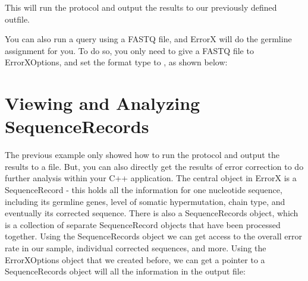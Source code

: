 \documentclass[letterpaper,10pt,english]{sphinxmanual}
\begin{document}
\begin{sphinxVerbatim}[commandchars=\\\{\}]
  
\end{sphinxVerbatim}

This will run the protocol and output the results to our previously defined outfile.

You can also run a query using a FASTQ file, and ErrorX will do the germline assignment for you. To do so, you only need to give a FASTQ file to ErrorXOptions, and set the format type to , as shown below:

\begin{sphinxVerbatim}[commandchars=\\\{\}]
    
  
  
  
  
\end{sphinxVerbatim}


\section{Viewing and Analyzing SequenceRecords}
\label{\detokenize{index:viewing-and-analyzing-sequencerecords}}
The previous example only showed how to run the protocol and output the results to a file. But, you can also directly get the results of error correction to do further analysis within your C++ application. The central object in ErrorX is a SequenceRecord - this holds all the information for one nucleotide sequence, including its germline genes, level of somatic hypermutation, chain type, and eventually its corrected sequence. There is also a SequenceRecords object, which is a collection of separate SequenceRecord objects that have been processed together. Using the SequenceRecords object we can get access to the overall error rate in our sample, individual corrected sequences, and more. Using the ErrorXOptions object that we created before, we can get a pointer to a SequenceRecords object will all the information in the output file:
\end{document}
